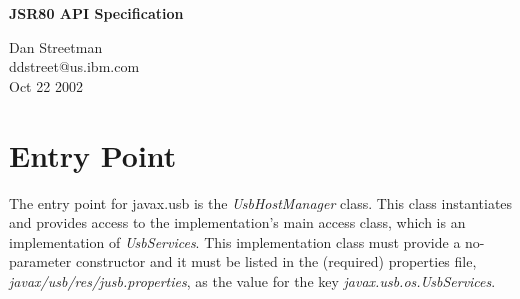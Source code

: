 \documentclass{article}
\begin{document}
\pagestyle{empty}

\newcommand{\mytitle}[0]{JSR80 API Specification}
\newcommand{\myauthor}[0]{Dan Streetman}
\newcommand{\mydate}[0]{Oct 22 2002}

%

\begin{titlepage}

\begin{center}
\Huge{\textbf{\mytitle}}
\end{center}

\vfill
\vfill

\begin{flushright}
\large{\myauthor}
\\
\large{ddstreet@us.ibm.com}
\\
\large{\mydate}
\end{flushright}

\vfill

\end{titlepage}

\newpage


%

\pagestyle{fancy}
\fancyhf{}
\renewcommand{\sectionmark}[1]{\markright{\emph{\mytitle}}}
\renewcommand{\subsectionmark}[1]{\markright{\emph{\mytitle}}}
\renewcommand{\subsubsectionmark}[1]{\markright{\emph{\mytitle}}}
\fancyhead[LE,RO]{\bfseries\thepage}
\fancyhead[LO]{\rightmark}


%

\tableofcontents

\listoftables

\listoffigures

\newpage

%

\section{Entry Point}

The entry point for javax.usb is the \emph{UsbHostManager} class.  This class instantiates
and provides access to the implementation's main access class, which is an implementation of
\emph{UsbServices}.  This implementation class must provide a no-parameter constructor
and it must be listed in the (required) properties file, \emph{javax/usb/res/jusb.properties},
as the value for the key \emph{javax.usb.os.UsbServices}.
\end{document}
